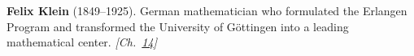 \textbf{Felix Klein} (1849–1925). German mathematician who formulated the Erlangen Program and transformed the University of G\"{o}ttingen into a leading mathematical center. \emph{[Ch.~\hyperref[ch:compacttwinparadox]{14}]}


